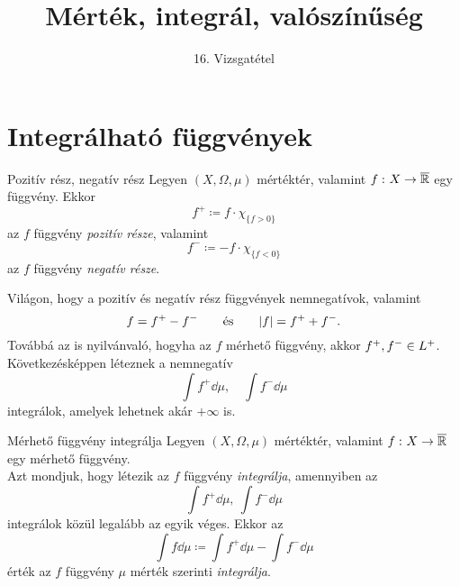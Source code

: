 \documentclass[
]{elteikthesis}[2024/04/26]
\title{Mérték, integrál, valószínűség} %
\subtitle{16. Vizsgatétel}
\begin{document}
	
	
	\section{Integrálható függvények}
	
	\begin{definition}{Pozitív rész, negatív rész}{}
		Legyen \( (X, \Omega, \mu) \) mértéktér,
		valamint  \( f \,\colon X \to \overline{ \mathbb{R} } \) egy függvény.
		Ekkor
		\[
			f^+ \coloneq f {\cdot} \chi_{\{ f > 0 \}}
		\]
		az \( f \) függvény \emph{pozitív része}, valamint
		\[
			f^- \coloneq -f {\cdot} \chi_{\{ f < 0 \}}
		\]
		az \( f \) függvény \emph{negatív része}.
	\end{definition}
	
	Világon, hogy a pozitív és negatív rész függvények nemnegatívok, valamint
	\[
		f = f^+ - f^-
		\qquad \text{és} \qquad
		\abs{f} = f^+ + f^-.
	\]
	Továbbá az is nyilvánvaló, hogyha az \( f \) mérhető függvény, 
	akkor \( f^+, f^- \in L^+ \).
	Következésképpen léteznek a nemnegatív
	\[
		\int f^+ \dd{\mu}, \quad \int f^- \dd{\mu}
	\]
	integrálok, amelyek lehetnek akár \( +\infty \) is.
	
	\begin{definition}{Mérhető függvény integrálja}{}
		Legyen \( (X, \Omega, \mu) \) mértéktér, 
		valamint \( f \,\colon X \to \overline{ \mathbb{R} } \) egy mérhető függvény.\\[3pt]
		Azt mondjuk, hogy létezik az \( f \) függvény \emph{integrálja}, amennyiben az
		\[
			\int f^+ \dd{\mu}, \ \int f^- \dd{\mu}
		\]
		integrálok közül legalább az egyik véges. Ekkor az
		\[
			\int f \dd{\mu} \coloneq
			\int f^+ \dd{\mu} - \int f^- \dd{\mu}
		\]
		érték az \( f \) függvény \( \mu \) mérték szerinti \emph{integrálja}.
	\end{definition}
	
\end{document}
